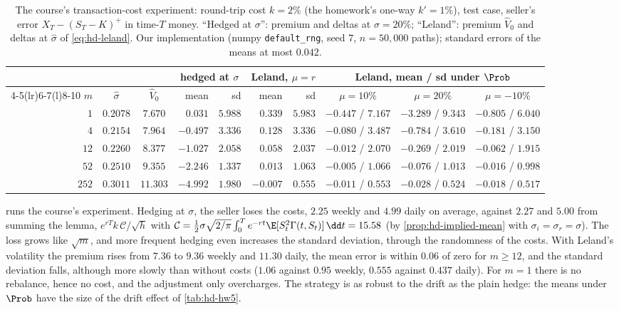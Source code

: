 \begin{table}[ht]
  \centering
  \small
  \setlength{\tabcolsep}{4pt}
  \begin{tabular}{@{}rccrrrrccc@{}}
    \toprule
    & & & \multicolumn{2}{c}{hedged at $\sigma$} & \multicolumn{2}{c}{Leland, $\mu=r$} & \multicolumn{3}{c}{Leland, mean / sd under $\Prob$}\\
    \cmidrule(lr){4-5}\cmidrule(lr){6-7}\cmidrule(l){8-10}
    $m$ & $\hat\sigma$ & $\hat V_0$ & mean & sd & mean & sd & $\mu=10\%$ & $\mu=20\%$ & $\mu=-10\%$\\
    \midrule
    $1$ & $0.2078$ & $7.670$ & $0.031$ & $5.988$ & $0.339$ & $5.983$ & $-0.447$ / $7.167$ & $-3.289$ / $9.343$ & $-0.805$ / $6.040$\\
    $4$ & $0.2154$ & $7.964$ & $-0.497$ & $3.336$ & $0.128$ & $3.336$ & $-0.080$ / $3.487$ & $-0.784$ / $3.610$ & $-0.181$ / $3.150$\\
    $12$ & $0.2260$ & $8.377$ & $-1.027$ & $2.058$ & $0.058$ & $2.037$ & $-0.012$ / $2.070$ & $-0.269$ / $2.019$ & $-0.062$ / $1.915$\\
    $52$ & $0.2510$ & $9.355$ & $-2.246$ & $1.337$ & $0.013$ & $1.063$ & $-0.005$ / $1.066$ & $-0.076$ / $1.013$ & $-0.016$ / $0.998$\\
    $252$ & $0.3011$ & $11.303$ & $-4.992$ & $1.980$ & $-0.007$ & $0.555$ & $-0.011$ / $0.553$ & $-0.028$ / $0.524$ & $-0.018$ / $0.517$\\
    \bottomrule
  \end{tabular}
  \caption{The course's transaction-cost experiment: round-trip cost $k=2\%$ (the homework's
    one-way $k'=1\%$), test case, seller's error $X_T-(S_T-K)^+$ in time-$T$ money. ``Hedged at
    $\sigma$'': premium and deltas at $\sigma=20\%$; ``Leland'': premium $\hat V_0$ and deltas at $\hat\sigma$ of
    \eqref{eq:hd-leland}. Our implementation (numpy \texttt{default\_rng}, seed $7$,
    $n=50{,}000$ paths); standard errors of the means at most $0.042$.}
  \label{tab:hd-leland}
\end{table}

 runs the course's experiment. Hedging at $\sigma$, the seller loses the
costs, $2.25$ weekly and $4.99$ daily on average, against $2.27$ and $5.00$ from summing the lemma,
$e^{rT}k\,\mathcal C/\sqrt h$ with
$\mathcal C=\frac12\sigma\sqrt{2/\pi}\int_0^Te^{-rt}\E[S_t^2\Gamma(t,S_t)]\,\dd t=15.58$ (by
\cref{prop:hd-implied-mean} with $\sigma_i=\sigma_r=\sigma$). The loss grows like $\sqrt m$, and more frequent
hedging even increases the standard deviation, through the randomness of the costs. With
Leland's volatility the premium rises from $7.36$ to $9.36$ weekly and $11.30$ daily, the mean
error is within $0.06$ of zero for $m\ge12$, and the standard deviation falls, although more
slowly than without costs ($1.06$ against $0.95$ weekly, $0.555$ against $0.437$ daily). For $m=1$
there is no rebalance, hence no cost, and the adjustment only overcharges. The strategy is as
robust to the drift as the plain hedge: the means under $\Prob$ have the size of the drift
effect of \cref{tab:hd-hw5}.

